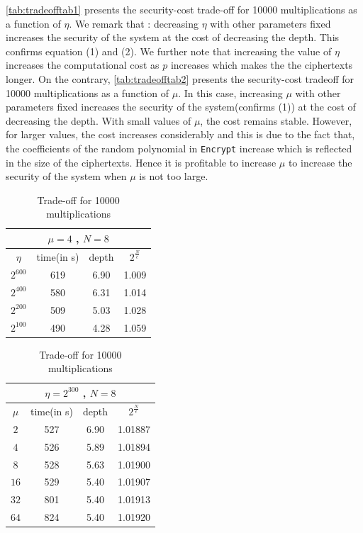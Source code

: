 \documentclass{acm_proc_article-sp}
\begin{document}
\autoref{tab:tradeofftab1} presents the security-cost trade-off for 10000 multiplications as a function of $\eta$. We remark that : decreasing $\eta$ with other parameters fixed increases the security of the system at the cost of decreasing the depth. This confirms equation (1) and (2).  We further note that increasing the value of $\eta$ increases the computational cost as $p$ increases which makes the the ciphertexts longer. On the contrary, \autoref{tab:tradeofftab2} presents the security-cost tradeoff for 10000 multiplications as a function of $\mu$. In this case, increasing $\mu$ with other parameters fixed increases the security of the system(confirms (1)) at the cost of decreasing the depth. With small values of $\mu$, the cost remains stable. However, for larger values, the cost increases considerably and this is due to the fact that, the coefficients of the random polynomial in \texttt{Encrypt} increase  which is reflected in the size of the ciphertexts. Hence it is profitable to increase $\mu$ to increase the security of the system when $\mu$ is not too large.

\begin{table}[htb]
  \centering
  \caption{Trade-off for 10000 multiplications}
\begin{tabular}{|c|c|c|c||}
  \hline
  \multicolumn{4}{|c||}{$\mu = 4$ , $N=8$} \\
  \hline
  $\eta$ &  time(in s)  & depth & $2^{\frac{N}{\epsilon}}$ \\
  \hline
  $2^{600}$ & 619  & 6.90 & 1.009 \\
  $2^{400}$ &  580 & 6.31 & 1.014 \\
  $2^{200}$ &  509 & 5.03 & 1.028 \\
  $2^{100}$ &  490 & 4.28 & 1.059 \\
   \hline
\end{tabular}
\normalsize
\label{tab:tradeofftab1}
\end{table}

\begin{table}[htb]
  \centering
  \caption{Trade-off for 10000 multiplications}
\begin{tabular}{|c|c|c|c||}
  \hline
  \multicolumn{4}{|c||}{$\eta = 2^{300}$ , $N=8$} \\
  \hline
  $\mu$ &  time(in s)  & depth & $2^{\frac{N}{\epsilon}}$ \\
  \hline
  $2$ & 527  & 6.90 & 1.01887 \\
  $4$ & 526 & 5.89 & 1.01894 \\
  $8$ & 528  & 5.63 & 1.01900 \\
  $16$ & 529  & 5.40 & 1.01907 \\
  $32$ & 801  & 5.40 & 1.01913 \\
  $64$ & 824  & 5.40 & 1.01920 \\

   \hline
\end{tabular}
\normalsize
\label{tab:tradeofftab2}
\end{table}
\end{document}
